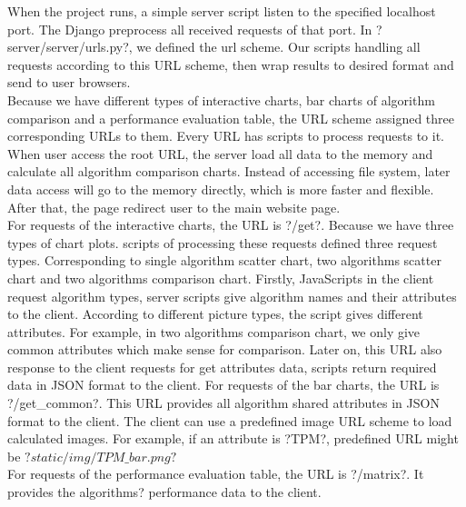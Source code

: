 \documentclass[11pt,letter]{article}
\begin{document}
When the project runs, a simple server script listen to the specified localhost port. The Django preprocess all received requests of that port. In ?server/server/urls.py?, we defined the url scheme. Our scripts handling all requests according to this URL scheme, then wrap results to desired format and send to user browsers.  \\
Because we have different types of interactive charts, bar charts of algorithm comparison and a performance evaluation table, the URL scheme assigned three corresponding URLs to them. Every URL has scripts to process requests to it. \\
When user access the root URL, the server load all data to the memory and calculate all algorithm comparison charts. Instead of accessing file system, later data access will go to the memory directly, which is more faster and flexible. After that, the page redirect user to the main website page. \\
For requests of the interactive charts, the URL is ?/get?. Because we have three types of chart plots. scripts of processing these requests defined three request types. Corresponding to single algorithm scatter chart, two algorithms scatter chart and two algorithms comparison chart. Firstly, JavaScripts in the client request algorithm types, server scripts give algorithm names and their attributes to the client. According to different picture types, the script gives different attributes. For example, in two algorithms comparison chart, we only give common attributes which make sense for comparison. Later on, this URL also response to the client requests for get attributes data, scripts return required data in JSON format to the client.
For requests of the bar charts, the URL is ?/get\_common?. This URL provides all algorithm shared attributes in JSON format to the client. The client can use a predefined image URL scheme to load calculated images. For example, if an attribute is ?TPM?, predefined URL might be $?static/img/TPM\_bar.png?$ \\
For requests of the performance evaluation table, the URL is ?/matrix?. It provides the algorithms? performance data to the client. \\
\end{document}
